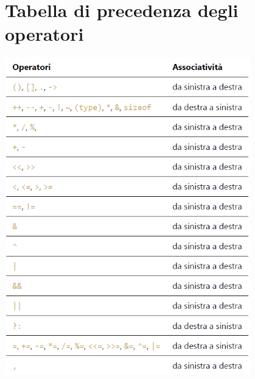 \appendix
\chapter{Tabella di precedenza degli operatori}

\begin{center}
	\includegraphics[width=0.8\textwidth]{img/operatori.png}
\end{center}